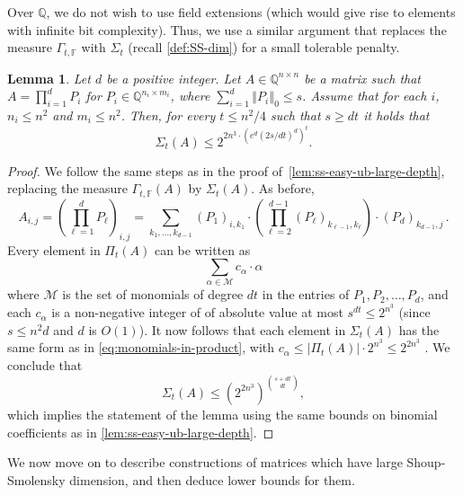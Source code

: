 \documentclass[10pt,a4paper]{article}
\newtheorem{lemma}[theorem]{Lemma}
\newcommand{\F}{\mathbb F}
\newcommand{\Q}{\mathbb Q}
\newcommand{\inparen}[1]{\left(#1\right)}
\newcommand{\spars}[1]{\left\Vert#1\right\Vert_0}
\begin{document}
Over $\Q$, we do not wish to use field extensions (which would give rise to elements with infinite bit complexity). Thus, we use a similar argument that replaces the measure $\Gamma_{t,\F}$ with $\Sigma_{t}$ (recall \autoref{def:SS-dim}) for a small tolerable penalty.
\begin{lemma}
\label{lem:ss-up-sigma}
Let $d$ be a positive integer. Let $A \in \Q^{n \times n}$ be a matrix such that $A = \prod_{i = 1}^d P_i$ for $P_i \in \Q^{n_i \times m_i}$, where $\sum_{i = 1}^d\spars{P_i} \leq s $. Assume that for each $i$,  $n_i \leq n^2$ and $m_i \leq n^2$. Then, for every $t\le n^2/4$ such that $s \ge dt$ it holds that
\[
\Sigma_{t}(A) \le 2^{2n^3\cdot \inparen{e^d (2s/dt)^d}^t}.
\]

\end{lemma}

\begin{proof}
We follow the same steps as in the proof of~\autoref{lem:ss-easy-ub-large-depth}, replacing the measure $\Gamma_{t,\F}(A)$ by $\Sigma_t(A)$. As before, 
\[
A_{i,j} = \left(\prod_{\ell = 1}^d P_{\ell}\right)_{i,j} = \sum_{k_1, \ldots, k_{d-1}} (P_1)_{i, k_1}\cdot \left(\prod_{\ell = 2}^{d-1} (P_{\ell})_{k_{\ell-1}, k_{\ell}} \right) \cdot (P_{d})_{k_{d-1}, j}\, .
\]
Every element in $\Pi_{t} (A)$ can be written as 
\begin{equation}
\label{eq:monomials-in-product}
\sum_{\alpha \in \mathcal{M}} c_\alpha \cdot \alpha
\end{equation}
where $\mathcal{M}$ is the set of monomials of degree $dt$ in the entries of $P_1, P_2, \ldots, P_d$, and each $c_\alpha$ is a non-negative integer of of absolute value at most $s^{dt} \le 2^{n^3}$ (since $s \leq n^2d$ and $d$ is $O(1)$). It now follows that each element in $\Sigma_t(A)$ has the same form as in \eqref{eq:monomials-in-product}, with $c_\alpha \le |\Pi_t(A)| \cdot 2^{n^3} \le 2^{2n^3}$ . We conclude that
\[
\Sigma_t(A) \le (2^{2n^3})^{\binom{s+dt}{dt}},
\]
which implies the statement of the lemma using the same bounds on binomial coefficients as in \autoref{lem:ss-easy-ub-large-depth}.
\end{proof}


We now move on to describe constructions of matrices which have large Shoup-Smolensky dimension, and then deduce lower bounds for them.
\end{document}
